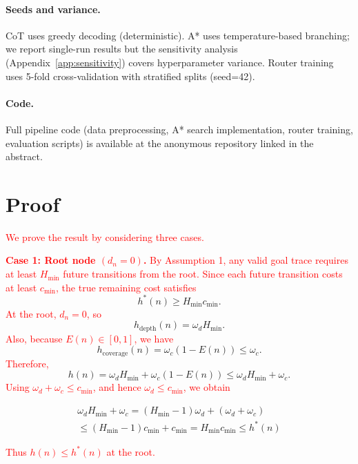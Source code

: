 \documentclass[11pt]{article}
\begin{document}
{\paragraph{Seeds and variance.} CoT uses greedy decoding (deterministic). A* uses temperature-based branching; we report single-run results but the sensitivity analysis (Appendix~\ref{app:sensitivity}) covers hyperparameter variance. Router training uses 5-fold cross-validation with stratified splits (seed=42).

\paragraph{Code.} Full pipeline code (data preprocessing, A* search implementation, router training, evaluation scripts) is available at the anonymous repository linked in the abstract.




\section{Proof}\label{full-proof}

\textcolor{red}{We prove the result by considering three cases.}

\textcolor{red}{\textbf{Case 1: Root node \((d_n=0)\).}}
\textcolor{red}{By Assumption 1, any valid goal trace requires at least \(H_{\min}\) future transitions from the root. Since each future transition costs at least \(c_{\min}\), the true remaining cost satisfies}
\[
h^*(n) \geq H_{\min}c_{\min}.
\]
\textcolor{red}{At the root, \(d_n=0\), so}
\[
h_{\mathrm{depth}}(n)=\omega_d H_{\min}.
\]
\textcolor{red}{Also, because \(E(n)\in[0,1]\), we have}
\[
h_{\mathrm{coverage}}(n)=\omega_c(1-E(n)) \leq \omega_c.
\]
\textcolor{red}{Therefore,}
\[
h(n) = \omega_d H_{\min} + \omega_c(1-E(n))
      \leq \omega_d H_{\min} + \omega_c.
\]
\textcolor{red}{Using \(\omega_d+\omega_c \leq c_{\min}\), and hence \(\omega_d \leq c_{\min}\), we obtain}


\begin{multline}
    \omega_d H_{\min} + \omega_c
= (H_{\min}-1)\omega_d + (\omega_d+\omega_c) \\
\leq (H_{\min}-1)c_{\min}+c_{\min}
= H_{\min}c_{\min}
\leq h^*(n)
\end{multline}


\textcolor{red}{Thus \(h(n)\leq h^*(n)\) at the root.}

}
\end{document}
